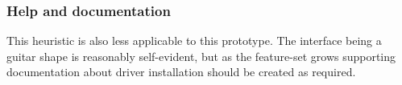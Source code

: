 
\subsubsection{Help and documentation}
This heuristic is also less applicable to this prototype. The interface being a guitar shape is reasonably self-evident, but as the feature-set grows supporting documentation about driver installation should be created as required. 










